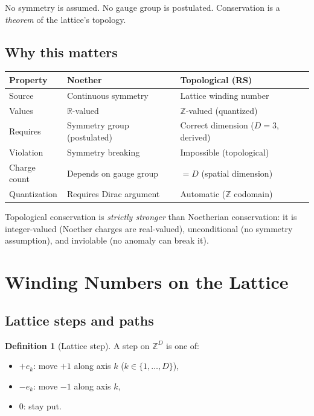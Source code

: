 \documentclass[11pt,a4paper]{article}
\theoremstyle{plain}
\theoremstyle{definition}
\newtheorem{definition}[theorem]{Definition}
\theoremstyle{remark}
\newcommand{\R}{\mathbb{R}}
\newcommand{\Z}{\mathbb{Z}}
\begin{document}
No symmetry is assumed.  No gauge group is postulated.  Conservation
is a \emph{theorem} of the lattice's topology.

\subsection{Why this matters}

\begin{center}
\begin{tabular}{@{}lll@{}}
\toprule
\textbf{Property} & \textbf{Noether} & \textbf{Topological (RS)} \\
\midrule
Source & Continuous symmetry & Lattice winding number \\
Values & $\R$-valued & $\Z$-valued (quantized) \\
Requires & Symmetry group (postulated) & Correct dimension ($D = 3$, derived) \\
Violation & Symmetry breaking & Impossible (topological) \\
Charge count & Depends on gauge group & $= D$ (spatial dimension) \\
Quantization & Requires Dirac argument & Automatic ($\Z$ codomain) \\
\bottomrule
\end{tabular}
\end{center}

Topological conservation is \emph{strictly stronger} than Noetherian
conservation: it is integer-valued (Noether charges are real-valued),
unconditional (no symmetry assumption), and inviolable (no anomaly can
break it).

\section{Winding Numbers on the Lattice}
\label{sec:winding}

\subsection{Lattice steps and paths}

\begin{definition}[Lattice step]
A step on $\Z^D$ is one of:
\begin{itemize}[nosep]
\item $+e_k$: move $+1$ along axis $k$ ($k \in \{1, \ldots, D\}$),
\item $-e_k$: move $-1$ along axis $k$,
\item $0$: stay put.
\end{itemize}
\end{definition}
\end{document}
